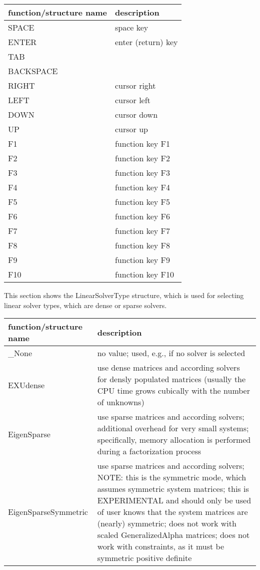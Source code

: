 \begin{center}
\footnotesize
\begin{longtable}{| p{8cm} | p{8cm} |} 
\hline
{\bf function/structure name} & {\bf description}\\ \hline
  SPACE & space key\\ \hline 
  ENTER & enter (return) key\\ \hline 
  TAB & \\ \hline 
  BACKSPACE & \\ \hline 
  RIGHT & cursor right\\ \hline 
  LEFT & cursor left\\ \hline 
  DOWN & cursor down\\ \hline 
  UP & cursor up\\ \hline 
  F1 & function key F1\\ \hline 
  F2 & function key F2\\ \hline 
  F3 & function key F3\\ \hline 
  F4 & function key F4\\ \hline 
  F5 & function key F5\\ \hline 
  F6 & function key F6\\ \hline 
  F7 & function key F7\\ \hline 
  F8 & function key F8\\ \hline 
  F9 & function key F9\\ \hline 
  F10 & function key F10\\ \hline 
\end{longtable}
\end{center}

\label{sec:LinearSolverType}
This section shows the LinearSolverType structure, which is used for selecting linear solver types, which are dense or sparse solvers.



\begin{center}
\footnotesize
\begin{longtable}{| p{8cm} | p{8cm} |} 
\hline
{\bf function/structure name} & {\bf description}\\ \hline
  \_None & no value; used, e.g., if no solver is selected\\ \hline 
  EXUdense & use dense matrices and according solvers for densly populated matrices (usually the CPU time grows cubically with the number of unknowns)\\ \hline 
  EigenSparse & use sparse matrices and according solvers; additional overhead for very small systems; specifically, memory allocation is performed during a factorization process\\ \hline 
  EigenSparseSymmetric & use sparse matrices and according solvers; NOTE: this is the symmetric mode, which assumes symmetric system matrices; this is EXPERIMENTAL and should only be used of user knows that the system matrices are (nearly) symmetric; does not work with scaled GeneralizedAlpha matrices; does not work with constraints, as it must be symmetric positive definite\\ \hline 
\end{longtable}
\end{center}

